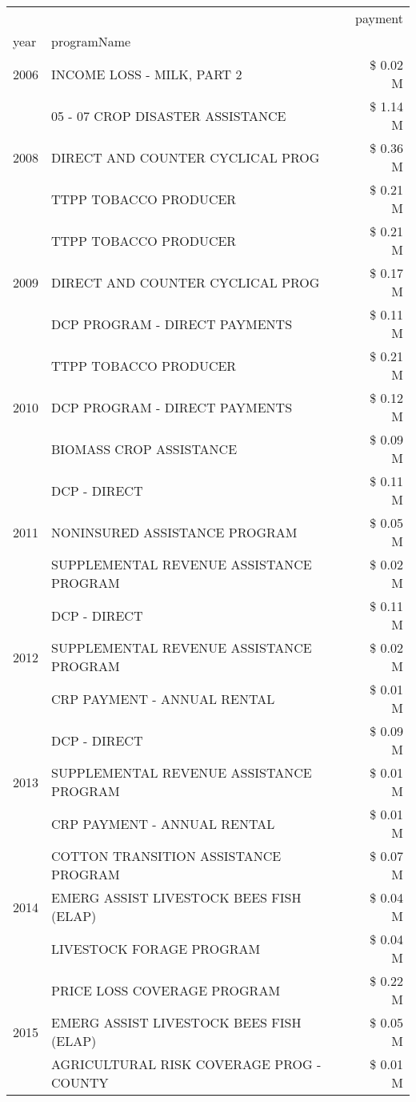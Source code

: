 \begin{tabular}{llr}
\toprule
 &  & payment \\
year & programName &  \\
\midrule
2006 & INCOME LOSS - MILK, PART 2 & \$ 0.02 M \\
\cline{1-3}
\multirow[t]{3}{*}{2008} & 05 - 07 CROP DISASTER ASSISTANCE & \$ 1.14 M \\
 & DIRECT AND COUNTER CYCLICAL PROG & \$ 0.36 M \\
 & TTPP TOBACCO PRODUCER & \$ 0.21 M \\
\cline{1-3}
\multirow[t]{3}{*}{2009} & TTPP TOBACCO PRODUCER & \$ 0.21 M \\
 & DIRECT AND COUNTER CYCLICAL PROG & \$ 0.17 M \\
 & DCP PROGRAM - DIRECT PAYMENTS & \$ 0.11 M \\
\cline{1-3}
\multirow[t]{3}{*}{2010} & TTPP TOBACCO PRODUCER & \$ 0.21 M \\
 & DCP PROGRAM - DIRECT PAYMENTS & \$ 0.12 M \\
 & BIOMASS CROP ASSISTANCE & \$ 0.09 M \\
\cline{1-3}
\multirow[t]{3}{*}{2011} & DCP - DIRECT & \$ 0.11 M \\
 & NONINSURED ASSISTANCE PROGRAM & \$ 0.05 M \\
 & SUPPLEMENTAL REVENUE ASSISTANCE PROGRAM & \$ 0.02 M \\
\cline{1-3}
\multirow[t]{3}{*}{2012} & DCP - DIRECT & \$ 0.11 M \\
 & SUPPLEMENTAL REVENUE ASSISTANCE PROGRAM & \$ 0.02 M \\
 & CRP PAYMENT - ANNUAL RENTAL & \$ 0.01 M \\
\cline{1-3}
\multirow[t]{3}{*}{2013} & DCP - DIRECT & \$ 0.09 M \\
 & SUPPLEMENTAL REVENUE ASSISTANCE PROGRAM & \$ 0.01 M \\
 & CRP PAYMENT - ANNUAL RENTAL & \$ 0.01 M \\
\cline{1-3}
\multirow[t]{3}{*}{2014} & COTTON TRANSITION ASSISTANCE PROGRAM & \$ 0.07 M \\
 & EMERG ASSIST LIVESTOCK BEES FISH (ELAP) & \$ 0.04 M \\
 & LIVESTOCK FORAGE PROGRAM & \$ 0.04 M \\
\cline{1-3}
\multirow[t]{3}{*}{2015} & PRICE LOSS COVERAGE PROGRAM & \$ 0.22 M \\
 & EMERG ASSIST LIVESTOCK BEES FISH (ELAP) & \$ 0.05 M \\
 & AGRICULTURAL RISK COVERAGE PROG - COUNTY & \$ 0.01 M \\

\end{tabular}
